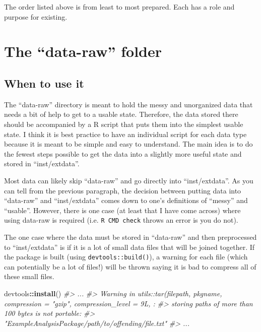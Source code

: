 \documentclass[]{book}
\newenvironment{Shaded}{\begin{snugshade}}{\end{snugshade}}
\newcommand{\CommentTok}[1]{\textcolor[rgb]{0.56,0.35,0.01}{\textit{#1}}}
\newcommand{\KeywordTok}[1]{\textcolor[rgb]{0.13,0.29,0.53}{\textbf{#1}}}
\newcommand{\NormalTok}[1]{#1}
\newcommand{\OperatorTok}[1]{\textcolor[rgb]{0.81,0.36,0.00}{\textbf{#1}}}
\begin{document}
The order listed above is from least to most prepared. Each has a role and purpose for existing.

\hypertarget{the-data-raw-folder}{%
\section{The ``data-raw'' folder}\label{the-data-raw-folder}}

\hypertarget{when-to-use-it}{%
\subsection{When to use it}\label{when-to-use-it}}

The ``data-raw'' directory is meant to hold the messy and unorganized data that needs a bit of help to get to a usable state. Therefore, the data stored there should be accompanied by a R script that puts them into the simplest usable state. I think it is best practice to have an individual script for each data type because it is meant to be simple and easy to understand. The main idea is to do the fewest steps possible to get the data into a slightly more useful state and stored in ``inst/extdata''.

Most data can likely skip ``data-raw'' and go directly into ``inst/extdata''. As you can tell from the previous paragraph, the decision between putting data into ``data-raw'' and ``inst/extdata'' comes down to one's definitions of ``messy'' and ``usable''. However, there is one case (at least that I have come across) where using data-raw is required (i.e. \texttt{R\ CMD\ check} throws an error is you do not).

The one case where the data must be stored in ``data-raw'' and then preprocessed to ``inst/extdata'' is if it is a lot of small data files that will be joined together. If the package is built (using \texttt{devtools::build()}), a warning for each file (which can potentially be a lot of files!) will be thrown saying it is bad to compress all of these small files.

\begin{Shaded}
\begin{Highlighting}[]
\NormalTok{devtools}\OperatorTok{::}\KeywordTok{install}\NormalTok{()}
\CommentTok{#> ...}
\CommentTok{#> Warning in utils::tar(filepath, pkgname, compression = "gzip", compression_level = 9L,  :}
\CommentTok{#>      storing paths of more than 100 bytes is not portable:}
\CommentTok{#>      "ExampleAnalysisPackage/path/to/offending/file.txt"}
\CommentTok{#> ...}
\end{Highlighting}
\end{Shaded}
\end{document}

